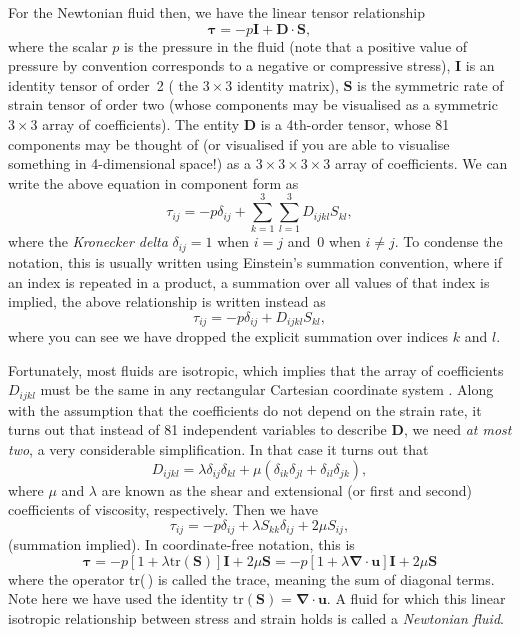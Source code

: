 \documentclass[twoside,11pt]		{report}
\begin{document}
For the Newtonian fluid then, we have the linear tensor relationship
\begin{equation}
\bm{\tau}=-p\bm{I} + \bm{D\cdot S},
\end{equation}
where the scalar $p$ is the pressure in the fluid (note that a
positive value of pressure by convention corresponds to a negative or
compressive stress), $\bm{I}$ is an identity tensor of order~2 (\ie
the $3\times3$ identity matrix), $\bm{S}$ is the symmetric rate of
strain tensor of order two (whose components may be visualised as a
symmetric $3\times3$ array of coefficients). The entity $\bm{D}$ is a
4th-order tensor, whose 81 components may be thought of (or visualised
if you are able to visualise something in 4-dimensional space!) as a
$3\times3\times3\times3$ array of coefficients. We can write the above
equation in component form as
\begin{equation}
\tau_{ij} = -p \delta_{ij} + \sum_{k=1}^3\sum_{l=1}^3 D_{ijkl}S_{kl},
\end{equation}
where the \emph{Kronecker delta} $\delta_{ij}=1$ when $i=j$ and~0 when
$i\ne j$. To condense the notation, this is usually written using
Einstein's summation convention, where if an index is repeated in a
product, a summation over all values of that index is implied, \ie the
above relationship is written instead as
\begin{equation}
\tau_{ij} = -p \delta_{ij} + D_{ijkl}S_{kl},
\end{equation}
where you can see we have dropped the explicit summation over indices
$k$ and $l$.

Fortunately, most fluids are isotropic, which implies that the array
of coefficients $D_{ijkl}$ must be the same in any rectangular
Cartesian coordinate system \citep[see e.g.][ch.~8]{fung69}. Along
with the assumption that the coefficients do not depend on the strain
rate, it turns out that instead of 81 independent variables to
describe $\bm{D}$, we need \emph{at most two}, a very considerable
simplification. In that case it turns out that 
\begin{equation}
D_{ijkl} = \lambda \delta_{ij}\delta_{kl} +
 \mu\left(\delta_{ik}\delta_{jl} + \delta_{il}\delta_{jk}\right),
\end{equation}
where $\mu$ and $\lambda$ are known as the shear and extensional (or
first and second) coefficients of viscosity, respectively. Then we
have
\begin{equation}
\tau_{ij} = -p \delta_{ij} + \lambda S_{kk}\delta_{ij} + 2\mu S_{ij},
\end{equation}
(summation implied). In coordinate-free notation, this is
\begin{equation}
\bm{\tau} =
-p\left[1 + \lambda \mathrm{tr}(\bm{S})\right]\bm{I} + 2\mu\bm{S}=
-p\left[1 + \lambda \bm{\nabla\cdot u}\right]\bm{I} + 2\mu\bm{S}
\end{equation}
where the operator tr(\,) is called the trace, meaning the sum of
diagonal terms. Note here we have used the identity
$\mathrm{tr}(\bm{S})=\bm{\nabla\cdot u}$. A fluid for which this
linear isotropic relationship between stress and strain holds is called
a \emph{Newtonian fluid}. 
\end{document}
